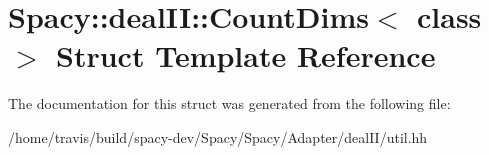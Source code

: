 \hypertarget{structSpacy_1_1dealII_1_1CountDims}{\section{Spacy\-:\-:deal\-I\-I\-:\-:Count\-Dims$<$ class $>$ Struct Template Reference}
\label{structSpacy_1_1dealII_1_1CountDims}
}


The documentation for this struct was generated from the following file\-:\begin{DoxyCompactItemize}
\item 
/home/travis/build/spacy-\/dev/\-Spacy/\-Spacy/\-Adapter/deal\-I\-I/util.\-hh\end{DoxyCompactItemize}
